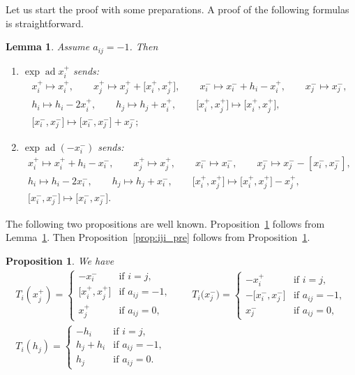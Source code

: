 \documentclass[11pt]{article}
\newtheorem{prop}[thm]{Proposition}
\newtheorem{lem}[thm]{Lemma}
\theoremstyle{definition}
\numberwithin{equation}{section}
\DeclareMathOperator{\ad}{ad}
\begin{document}
Let us start the proof with some preparations. A proof of the following formulas is straightforward.
\begin{lem}\label{lem:expad1} Assume $a_{ij}=-1$. Then
\begin{enumerate}\itemsep=0pt
\item $\exp\ad x_{i}^{+}$ sends:
\begin{gather*}
x_i^+ \mapsto x_i^+, \qquad x_j^+ \mapsto x_j^+ + \big[x_i^+,x_j^+\big],\qquad x_i^- \mapsto x_i^-+h_i-x_i^+, \qquad x_j^- \mapsto x_j^-,\\
h_i \mapsto h_i-2x_i^+,\qquad h_j \mapsto h_j+x_i^+,\qquad \big[x_i^+,x_j^+\big] \mapsto \big[x_i^+,x_j^+\big],\\
 \big[x_i^-,x_j^-\big] \mapsto \big[x_i^-,x_j^-\big] + x_j^-;
\end{gather*}
\item $\exp\ad (-x_{i}^{-})$ sends:
\begin{gather*}
x_i^+ \mapsto x_i^++h_i-x_i^-, \qquad x_j^+ \mapsto x_j^+,\qquad x_i^- \mapsto x_i^-, \qquad x_j^- \mapsto x_j^--[x_i^-,x_j^-],\\
h_i \mapsto h_i-2x_i^-,\qquad h_j \mapsto h_j+x_i^-,\qquad \big[x_i^+,x_j^+\big] \mapsto \big[x_i^+,x_j^+\big]-x_j^+,\\
 \big[x_i^-,x_j^-\big] \mapsto \big[x_i^-,x_j^-\big].
\end{gather*}
\end{enumerate}
\end{lem}

The following two propositions are well known. Proposition~\ref{prop:formula1} follows from Lemma~\ref{lem:expad1}. Then Proposition~\ref{prop:iji_pre} follows from Proposition~\ref{prop:formula1}.
\begin{prop}\label{prop:formula1} We have
\begin{gather*}
T_i(x_j^+) = \begin{cases}
-x_i^- & \text{if $i=j$},\\
\big[x_i^+,x_j^+\big] & \text{if $a_{ij}=-1$},\\
x_j^+ & \text{if $a_{ij}=0$},
\end{cases}\qquad
T_i\big(x_j^-\big) = \begin{cases}
-x_i^+ & \text{if $i=j$},\\
-\big[x_i^-,x_j^-\big] & \text{if $a_{ij}=-1$},\\
x_j^- & \text{if $a_{ij}=0$},
\end{cases}
\\
T_i(h_j) = \begin{cases}
-h_i & \text{if $i=j$},\\
h_j + h_i & \text{if $a_{ij}=-1$},\\
h_j & \text{if $a_{ij}=0$}.
\end{cases}
\end{gather*}
\end{prop}
\end{document}
